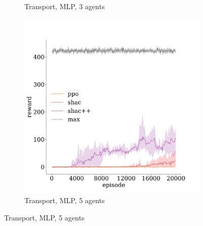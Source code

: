 \begin{figure}[t]
\begin{subfigure}[b]{0.32\textwidth}
        \caption{Transport, MLP, 3 agents}
        \label{apx:fig:transport-mlp-3}
    \end{subfigure}
    \begin{subfigure}[b]{0.32\textwidth}
        \includegraphics[width=\textwidth]{figs/transport-5-mlp.pdf}
        \caption{Transport, MLP, 5 agents}
        \label{apx:fig:transport-mlp-5}
    \end{subfigure}


\end{figure}
